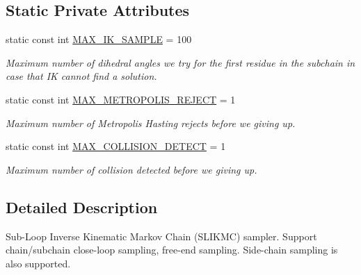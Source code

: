 \subsection*{Static Private Attributes}
\begin{DoxyCompactItemize}
\item 
\hypertarget{classSLIKMCSampler_a20c7cb30fd8c44b73a1f0b3cdf8a3de0}{static const int \hyperlink{classSLIKMCSampler_a20c7cb30fd8c44b73a1f0b3cdf8a3de0}{M\-A\-X\-\_\-\-I\-K\-\_\-\-S\-A\-M\-P\-L\-E} = 100}\label{classSLIKMCSampler_a20c7cb30fd8c44b73a1f0b3cdf8a3de0}

\begin{DoxyCompactList}\small\item\em Maximum number of dihedral angles we try for the first residue in the subchain in case that I\-K cannot find a solution. \end{DoxyCompactList}\item 
\hypertarget{classSLIKMCSampler_abc1df4b8a822398b575e67dd35912b8d}{static const int \hyperlink{classSLIKMCSampler_abc1df4b8a822398b575e67dd35912b8d}{M\-A\-X\-\_\-\-M\-E\-T\-R\-O\-P\-O\-L\-I\-S\-\_\-\-R\-E\-J\-E\-C\-T} = 1}\label{classSLIKMCSampler_abc1df4b8a822398b575e67dd35912b8d}

\begin{DoxyCompactList}\small\item\em Maximum number of Metropolis Hasting rejects before we giving up. \end{DoxyCompactList}\item 
\hypertarget{classSLIKMCSampler_a2e02967b4a1934c30885da10ce4ca3bf}{static const int \hyperlink{classSLIKMCSampler_a2e02967b4a1934c30885da10ce4ca3bf}{M\-A\-X\-\_\-\-C\-O\-L\-L\-I\-S\-I\-O\-N\-\_\-\-D\-E\-T\-E\-C\-T} = 1}\label{classSLIKMCSampler_a2e02967b4a1934c30885da10ce4ca3bf}

\begin{DoxyCompactList}\small\item\em Maximum number of collision detected before we giving up. \end{DoxyCompactList}\end{DoxyCompactItemize}


\subsection{Detailed Description}
Sub-\/\-Loop Inverse Kinematic Markov Chain (S\-L\-I\-K\-M\-C) sampler. Support chain/subchain close-\/loop sampling, free-\/end sampling. Side-\/chain sampling is also supported. 

